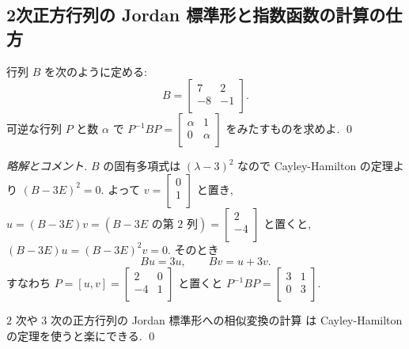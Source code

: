 \documentclass[12pt,twoside]{jarticle}
\newcommand\commentout[1]{#1}
\newcommand\commentout[1]{}
\begin{document}

\subsection{2次正方行列の Jordan 標準形と指数函数の計算の仕方}
\label{sec:2x2-Jordan}


\begin{question}[簡単だが一度はやるべき問題なので10点]
\label{q:2x2-Jordan-B}
  行列 $B$ を次のように定める:
  \begin{equation*}
    B = 
    \begin{bmatrix}
        7 &  2 \\
       -8 & -1 \\
     \end{bmatrix}.
   \end{equation*}
   可逆な行列 $P$ と数 $\alpha$ で %
   $P^{-1}BP = 
   \begin{bmatrix}
     \alpha & 1 \\
     0 & \alpha \\
   \end{bmatrix}$ をみたすものを求めよ. 
   \qed
\end{question}

\commentout{
\begin{proof}[略解とコメント]
$B$ の固有多項式は $(\lambda-3)^2$ なので 
Cayley-Hamilton の定理より $(B-3E)^2=0$.  
よって $v=
\begin{bmatrix}
  0 \\
  1 \\
\end{bmatrix}$ と置き, $u = (B-3E)v = (\text{$B-3E$ の第 $2$ 列}) = 
\begin{bmatrix}
  2 \\
  -4 \\
\end{bmatrix}$ と置くと, $(B-3E)u=(B-3E)^2v=0$. そのとき
\begin{equation*}
  Bu = 3u, \qquad Bv = u + 3v.
\end{equation*}
すなわち $P = [u,v] = 
\begin{bmatrix}
   2 & 0 \\
  -4 & 1 \\
\end{bmatrix}$ と置くと $P^{-1}BP=
\begin{bmatrix}
  3 & 1 \\
  0 & 3 \\
\end{bmatrix}$.

\medskip\noindent {\bf コメント.} 
$2$ 次や $3$ 次の正方行列の Jordan 標準形への相似変換の計算
は Cayley-Hamilton の定理を使うと楽にできる.
\qed
\end{proof}
}
\end{document}

